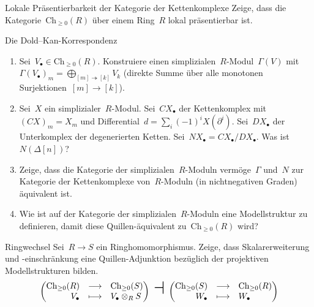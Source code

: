 \documentclass{uebblatt}
\newcommand{\Ch}{\mathrm{Ch}}
\begin{document}

\begin{aufgabe}{Lokale Präsentierbarkeit der Kategorie der Kettenkomplexe}
Zeige, dass die Kategorie~$\Ch_{\geq0}(R)$ über einem Ring~$R$ lokal
präsentierbar ist.
\end{aufgabe}

\begin{aufgabe}{Die Dold--Kan-Korrespondenz}
\begin{enumerate}
\item Sei~$V_\bullet \in \Ch_{\geq0}(R)$. Konstruiere einen
simplizialen~$R$-Modul~$\Gamma(V)$ mit~$\Gamma(V_\bullet)_m = \bigoplus_{[m]
\twoheadrightarrow [k]} V_k$ (direkte Summe über alle monotonen
Surjektionen~$[m] \to [k]$).
\item Sei~$X$ ein simplizialer~$R$-Modul. Sei~$CX_\bullet$ der Kettenkomplex
mit~$(CX)_m = X_m$ und Differential~$d = \sum_i (-1)^i X(\partial^i)$.
Sei~$DX_\bullet$ der Unterkomplex der degenerierten Ketten. Sei~$NX_\bullet =
CX_\bullet/DX_\bullet$. Was ist~$N(\Delta[n])$?
\item Zeige, dass die Kategorie der simplizialen~$R$-Moduln vermöge~$\Gamma$
und~$N$ zur Kategorie der Kettenkomplexe von~$R$-Moduln (in nichtnegativen
Graden) äquivalent ist.
\item Wie ist auf der Kategorie der simplizialen~$R$-Moduln eine
Modellstruktur zu definieren, damit diese Quillen-äquivalent
zu~$\Ch_{\geq0}(R)$ wird?
\end{enumerate}
\end{aufgabe}

\begin{aufgabe}{Ringwechsel}
Sei~$R \to S$ ein Ringhomomorphismus. Zeige, dass
Skalarerweiterung und -einschränkung eine Quillen-Adjunktion bezüglich der
projektiven Modellstrukturen bilden.
\[ \left(\begin{array}{@{}rcl@{}}
  \Ch_{\geq0}(R) &\longrightarrow& \Ch_{\geq0}(S) \\
  V_\bullet &\longmapsto& V_\bullet \otimes_R S
\end{array}\right)\ \text{\huge$\dashv$}\ \left(\begin{array}{@{}rcl@{}}
  \Ch_{\geq0}(S) &\longrightarrow& \Ch_{\geq0}(R) \\
  W_\bullet &\longmapsto& W_\bullet
\end{array}\right) \]
\vspace{-1em}
\end{aufgabe}
\end{document}
